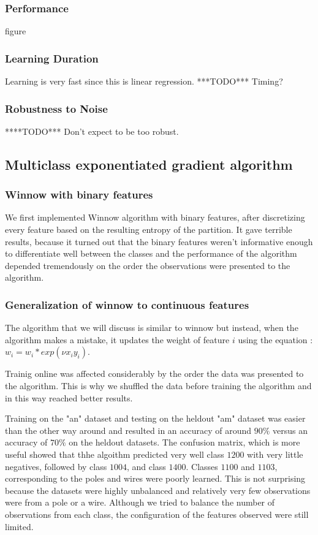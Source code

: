 \documentclass[10pt,a4paper]{article}
\begin{document}
\subsubsection{Performance}
figure

\subsubsection{Learning Duration}
Learning is very fast since this is linear regression. ***TODO*** Timing?

\subsubsection{Robustness to Noise}
****TODO*** Don't expect to be too robust.
\subsection{Multiclass exponentiated gradient algorithm}

\subsubsection{Winnow with binary features}
We first implemented Winnow algorithm with binary features, after discretizing every feature based on the resulting entropy of the partition. It gave terrible results, because it turned out that the binary features weren't informative enough to differentiate well between the classes and the performance of the algorithm depended tremendously on the order the observations were presented to the algorithm. 

\subsubsection{Generalization of winnow to continuous features}

The algorithm that we will discuss is similar to winnow but instead, when the algorithm makes a mistake, it updates the weight of feature $i$ using the equation : $w_i = w_i*exp(\nu x_i y_i)$. 

Trainig online was affected considerably by the order the data was presented to the algorithm. This is why we shuffled the data before training the algorithm and in this way reached better results.

Training on the "an" dataset and testing on the heldout "am" dataset was easier than the other way around and resulted in an accuracy of around $90\%$ versus an accuracy of $70\%$ on the heldout datasets. The confusion matrix, which is more useful showed that thhe algoithm predicted very well class $1200$ with very little negatives, followed by class $1004$, and class $1400$. Classes $1100$ and $1103$, corresponding to the poles and wires were poorly learned. This is not surprising because the datasets were highly unbalanced and relatively very few observations were from a pole or a wire. Although we tried to balance the number of observations from each class, the configuration of the features observed were still limited.
\end{document}
